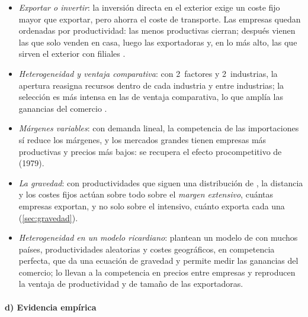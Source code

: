 \documentclass[11pt]{article}
\begin{document}
\begin{itemize}
\item \emph{Exportar o invertir}\nocite{HelpmanMelitzYeaple2004Export}: la inversión directa en el exterior exige un coste fijo mayor que exportar, pero ahorra el coste de transporte. Las empresas quedan ordenadas por productividad: las menos productivas cierran; después vienen las que solo venden en casa, luego las exportadoras y, en lo más alto, las que sirven el exterior con filiales .
\item \emph{Heterogeneidad y ventaja comparativa}\nocite{BernardReddingSchott2007Comparative}: con 2~factores y 2~industrias, la apertura reasigna recursos dentro de cada industria y entre industrias; la selección es más intensa en las de ventaja comparativa, lo que amplía las ganancias del comercio .
\item \emph{Márgenes variables}\nocite{MelitzOttaviano2008Market}: con demanda lineal, la competencia de las importaciones sí reduce los márgenes, y los mercados grandes tienen empresas más productivas y precios más bajos: se recupera el efecto procompetitivo de  (1979).
\item \emph{La gravedad}\nocite{Chaney2008Distorted}: con productividades que siguen una distribución de , la distancia y los costes fijos actúan sobre todo sobre el \emph{margen extensivo}, cuántas empresas exportan, y no solo sobre el intensivo, cuánto exporta cada una (\ref{sec:gravedad}).
\item \emph{Heterogeneidad en un modelo ricardiano}: \textcite{EatonKortum2002Technology} plantean un modelo de  con muchos países, productividades aleatorias y costes geográficos, en competencia perfecta, que da una ecuación de gravedad y permite medir las ganancias del comercio; \textcite{BernardEatonJensenKortum2003Plants} lo llevan a la competencia en precios entre empresas y reproducen la ventaja de productividad y de tamaño de las exportadoras.
\end{itemize}

\paragraph{d) Evidencia empírica}
\end{document}
